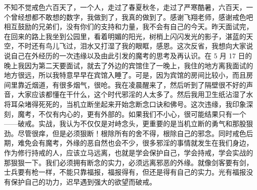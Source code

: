 \begin{case}
    不知不觉戒色六百天了，一个人，走过了春夏秋冬，走过了严寒酷暑，六百天，一个曾经想都不敢想的数字，我做到了，我真的做到了。感谢飞翔老师，感谢戒色吧相互鼓励的兄弟们，没有你们的支持和力量，我不会有自己的今天。昨天面试完，在回来的路上我坐到公园里，看着明媚的阳光，树梢上闪闪发光的影子，湛蓝的天空，不时还有鸟儿飞过，泪水又打湿了我的眼眶，感恩。这次反省，我想向大家说说自己在外经历的一次违缘以及由此引发的魔考的思考及再认识。在 5 月 17 日的晚上我因为第二天要面试，就去了外边的宾馆住了一晚上，我住的地方离我面试的地方很远，所以我特意早早在宾馆入睡了。可是，因为宾馆的房间比较小，而且房间里靠近烟道，有很多烟气，很呛。我在凌晨醒来了，然后听到了隔壁很不好的声音，大家应该都懂在干什么，这个时代邪淫的人太多了。然后我用卫生纸沾湿了水将耳朵堵得死死的，当机立断坐起来开始念断念口诀和佛号。这次违缘，我印象深刻，魔考，不仅有内心的，更有外部的。如果我们不小心，很可能结果只有一个——破戒。实战，我认为不仅仅是对峙念头，更重要的是当机立断的勇气和那股狠劲。尽管很痒，但是必须狠断！根除所有的舍不得，根除自己的邪念。同时戒色后期，难免会有魔考，外缘的恶自然也会不少，很多邪淫的事情就发生在我们身边，作为修行持戒的人，应该立马远离，也就是学会保护自己，学会持戒，学会实战的那狠狠一下。我们必须拥有断念的实力，必须远离邪恶的外缘。就像剑客要有剑，士兵要有枪一样，不能只靠福报，福报得有，但还是得有自己的实力。光有福报没有保护自己的功力，迟早遇到强大的欲望而破戒。


\end{case}
